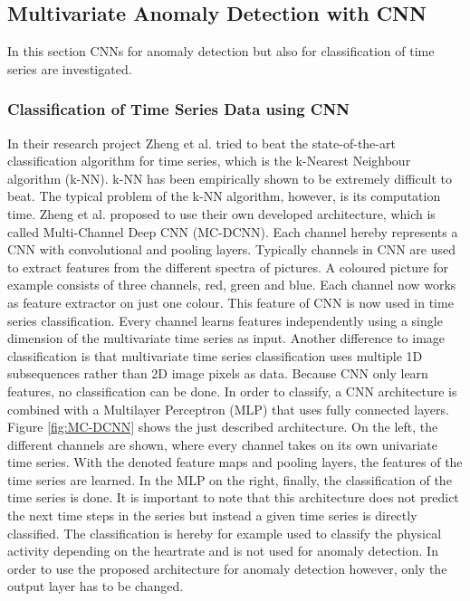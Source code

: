 \subsection{Multivariate Anomaly Detection with CNN}
In this section CNNs for anomaly detection but also for classification of time series are investigated. 

\subsubsection{Classification of Time Series Data using CNN}
In their research project Zheng et al. \parencite*{Zheng2014} tried to beat the state-of-the-art classification algorithm for time series, which is the k-Nearest Neighbour algorithm (k-NN). k-NN has been empirically shown to be extremely difficult to beat. The typical problem of the k-NN algorithm, however, is its computation time. Zheng et al. proposed to use their own developed architecture, which is called Multi-Channel Deep CNN (MC-DCNN). Each channel  hereby represents a CNN with convolutional and pooling layers.
Typically channels in CNN are used to extract features from the different spectra of pictures. A coloured picture for example consists of three channels, red, green and blue. Each channel now works as feature extractor on just one colour.
This feature of CNN is now used in time series classification. Every channel learns features independently using a single dimension of the multivariate time series as input. Another difference to image classification is that multivariate time series classification uses multiple 1D subsequences rather than 2D image pixels as data. Because CNN only learn features, no classification can be done. In order to classify, a CNN architecture is combined with a Multilayer Perceptron (MLP) that uses fully connected layers. Figure \ref{fig:MC-DCNN} shows the just described architecture. On the left, the different channels are shown, where every channel takes on its own univariate time series. With the denoted feature maps and pooling layers, the features of the time series are learned. In the MLP on the right, finally, the classification of the time series is done. 
It is important to note that this architecture does not predict the next time steps in the series but instead a given time series is directly classified. The classification is hereby for example used to classify the physical activity depending on the heartrate and is not used for anomaly detection. In order to use the proposed architecture for anomaly detection however, only the output layer has to be changed. 

